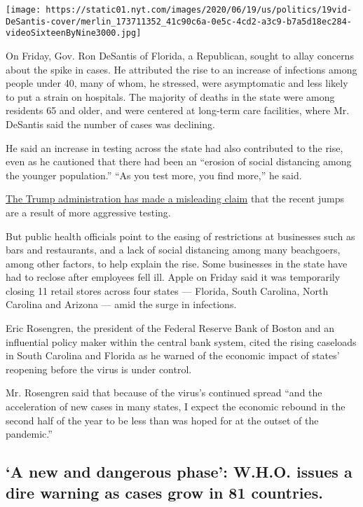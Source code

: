 \texttt{[image: https://static01.nyt.com/images/2020/06/19/us/politics/19vid-DeSantis-cover/merlin\_173711352\_41c90c6a-0e5c-4cd2-a3c9-b7a5d18ec284-videoSixteenByNine3000.jpg]}

On Friday, Gov. Ron DeSantis of Florida, a Republican, sought to allay
concerns about the spike in cases. He attributed the rise to an increase
of infections among people under 40, many of whom, he stressed, were
asymptomatic and less likely to put a strain on hospitals. The majority
of deaths in the state were among residents 65 and older, and were
centered at long-term care facilities, where Mr. DeSantis said the
number of cases was declining.

He said an increase in testing across the state had also contributed to
the rise, even as he cautioned that there had been an ``erosion of
social distancing among the younger population.'' ``As you test more,
you find more,'' he said.

\href{https://www.nytimes.com/2020/06/15/us/politics/pence-coronavirus-governors.html}{The
Trump administration has made a misleading claim} that the recent jumps
are a result of more aggressive testing.

But public health officials point to the easing of restrictions at
businesses such as bars and restaurants, and a lack of social distancing
among many beachgoers, among other factors, to help explain the rise.
Some businesses in the state have had to reclose after employees fell
ill. Apple on Friday said it was temporarily closing 11 retail stores
across four states --- Florida, South Carolina, North Carolina and
Arizona --- amid the surge in infections.

Eric Rosengren, the president of the Federal Reserve Bank of Boston and
an influential policy maker within the central bank system, cited the
rising caseloads in South Carolina and Florida as he warned of the
economic impact of states' reopening before the virus is under control.

Mr. Rosengren said that because of the virus's continued spread ``and
the acceleration of new cases in many states, I expect the economic
rebound in the second half of the year to be less than was hoped for at
the outset of the pandemic.''

\hypertarget{a-new-and-dangerous-phase-who-issues-a-dire-warning-as-cases-grow-in-81-countries}{%
\subsection{`A new and dangerous phase': W.H.O. issues a dire warning as
cases grow in 81
countries.}\label{a-new-and-dangerous-phase-who-issues-a-dire-warning-as-cases-grow-in-81-countries}}

